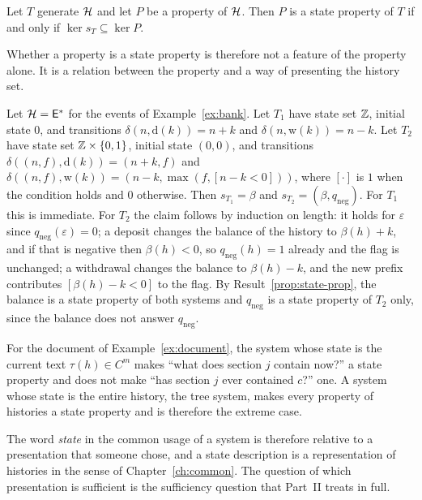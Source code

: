 \begin{established}\label{prop:state-prop}
Let $T$ generate $\mathcal{H}$ and let $P$ be a property of $\mathcal{H}$. Then $P$ is a state property of $T$ if and only if $\ker s_T\subseteq\ker P$.
\end{established}

Whether a property is a state property is therefore not a feature of the property alone. It is a relation between the property and a way of presenting the history set.

\begin{example}\label{ex:two-presentations}
Let $\mathcal{H}=\mathsf{E}^{*}$ for the events of Example~\ref{ex:bank}. Let $T_1$ have state set $\mathbb{Z}$, initial state $0$, and transitions $\delta(n,\mathrm{d}(k))=n+k$ and $\delta(n,\mathrm{w}(k))=n-k$. Let $T_2$ have state set $\mathbb{Z}\times\{0,1\}$, initial state $(0,0)$, and transitions $\delta((n,f),\mathrm{d}(k))=(n+k,f)$ and $\delta((n,f),\mathrm{w}(k))=(n-k,\max(f,[n-k<0]))$, where $[\cdot]$ is $1$ when the condition holds and $0$ otherwise. Then $s_{T_1}=\beta$ and $s_{T_2}=(\beta,q_{\mathrm{neg}})$. For $T_1$ this is immediate. For $T_2$ the claim follows by induction on length: it holds for $\varepsilon$ since $q_{\mathrm{neg}}(\varepsilon)=0$; a deposit changes the balance of the history to $\beta(h)+k$, and if that is negative then $\beta(h)<0$, so $q_{\mathrm{neg}}(h)=1$ already and the flag is unchanged; a withdrawal changes the balance to $\beta(h)-k$, and the new prefix contributes $[\beta(h)-k<0]$ to the flag. By Result~\ref{prop:state-prop}, the balance is a state property of both systems and $q_{\mathrm{neg}}$ is a state property of $T_2$ only, since the balance does not answer $q_{\mathrm{neg}}$.
\end{example}

\begin{example}[Document]
For the document of Example~\ref{ex:document}, the system whose state is the current text $\tau(h)\in C^{m}$ makes ``what does section $j$ contain now?'' a state property and does not make ``has section $j$ ever contained $c$?'' one. A system whose state is the entire history, the tree system, makes every property of histories a state property and is therefore the extreme case.
\end{example}

The word \emph{state} in the common usage of a system is therefore relative to a presentation that someone chose, and a state description is a representation of histories in the sense of Chapter~\ref{ch:common}. The question of which presentation is sufficient is the sufficiency question that Part~II treats in full.

